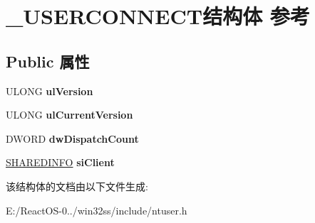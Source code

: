 \hypertarget{struct___u_s_e_r_c_o_n_n_e_c_t}{}\section{\+\_\+\+U\+S\+E\+R\+C\+O\+N\+N\+E\+C\+T结构体 参考}
\label{struct___u_s_e_r_c_o_n_n_e_c_t}
\subsection*{Public 属性}
\begin{DoxyCompactItemize}
\item 
\mbox{\label{struct___u_s_e_r_c_o_n_n_e_c_t_a095137677ba8a0b5c61960a85b434e5f}} 
U\+L\+O\+NG {\bfseries ul\+Version}
\item 
\mbox{\label{struct___u_s_e_r_c_o_n_n_e_c_t_aa062392d532cd385ddb0dba5fb4359c1}} 
U\+L\+O\+NG {\bfseries ul\+Current\+Version}
\item 
\mbox{\label{struct___u_s_e_r_c_o_n_n_e_c_t_a5c5b992ebbc03d73109b8757f4c35330}} 
D\+W\+O\+RD {\bfseries dw\+Dispatch\+Count}
\item 
\mbox{\label{struct___u_s_e_r_c_o_n_n_e_c_t_ac2e6e7e5671fe645264e44e593ae3f13}} 
\hyperlink{struct___s_h_a_r_e_d_i_n_f_o}{S\+H\+A\+R\+E\+D\+I\+N\+FO} {\bfseries si\+Client}
\end{DoxyCompactItemize}


该结构体的文档由以下文件生成\+:\begin{DoxyCompactItemize}
\item 
E\+:/\+React\+O\+S-\/0../win32ss/include/ntuser.\+h\end{DoxyCompactItemize}
